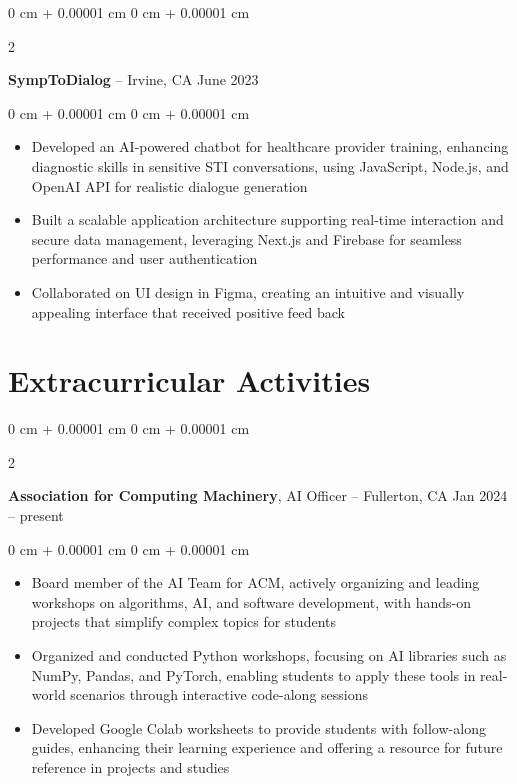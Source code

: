 \documentclass[10pt, letterpaper]{article}
\newenvironment{highlights}{
    \begin{itemize}[
        topsep=0.10 cm,
        parsep=0.10 cm,
        partopsep=0pt,
        itemsep=0pt,
        leftmargin=0 cm + 10pt
    ]
}{
    \end{itemize}
} %
\newenvironment{onecolentry}{
    \begin{adjustwidth}{
        0 cm + 0.00001 cm
    }{
        0 cm + 0.00001 cm
    }
}{
    \end{adjustwidth}
} %
\newenvironment{twocolentry}[2][]{
    \onecolentry
    \def\secondColumn{#2}
    \setcolumnwidth{\fill, 4.5 cm}
    \begin{paracol}{2}
}{
    \switchcolumn \raggedleft \secondColumn
    \end{paracol}
    \endonecolentry
} %
\begin{document}
        \vspace{0.2 cm}

        \begin{twocolentry}{
            June 2023
        }
            \textbf{SympToDialog} -- Irvine, CA\end{twocolentry}

        \vspace{0.10 cm}
        \begin{onecolentry}
            \begin{highlights}
                \item Developed an AI-powered chatbot for healthcare provider training, enhancing diagnostic skills in sensitive STI conversations, using JavaScript, Node.js, and OpenAI API for realistic dialogue generation
                \item Built a scalable application architecture supporting real-time interaction and secure data management, leveraging Next.js and Firebase for seamless performance and user authentication
                \item Collaborated on UI design in Figma, creating an intuitive and visually appealing interface that received positive feed back
            \end{highlights}
        \end{onecolentry}



    
    \section{Extracurricular Activities}



        
        \begin{twocolentry}{
            Jan 2024 – present
        }
            \textbf{Association for Computing Machinery}, AI Officer -- Fullerton, CA\end{twocolentry}

        \vspace{0.10 cm}
        \begin{onecolentry}
            \begin{highlights}
                \item Board member of the AI Team for ACM, actively organizing and leading workshops on algorithms, AI, and software development, with hands-on projects that simplify complex topics for students
                \item Organized and conducted Python workshops, focusing on AI libraries such as NumPy, Pandas, and PyTorch, enabling students to apply these tools in real-world scenarios through interactive code-along sessions
                \item Developed Google Colab worksheets to provide students with follow-along guides, enhancing their learning experience and offering a resource for future reference in projects and studies
            \end{highlights}
        \end{onecolentry}
\end{document}
